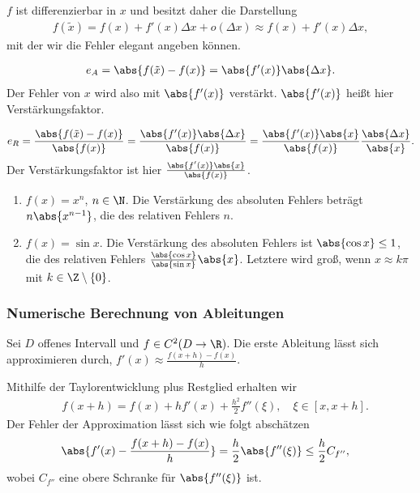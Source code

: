 $f$ ist differenzierbar in $x$ und besitzt daher die Darstellung
\begin{align*}
f(\tilde{x}) = f(x) + f'(x)\Delta x + o(\Delta x) \approx f(x) + f'(x)\Delta x,
\end{align*}
mit der wir die Fehler elegant angeben können.
\begin{bemn}
\begin{align*}
e_A = \abs{f(\tilde{x})-f(x)} = \abs{f'(x)}\abs{\Delta x}.
\end{align*}
Der Fehler von $x$ wird also mit $\abs{f'(x)}$ verstärkt. $\abs{f'(x)}$ heißt
hier Verstärkungsfaktor.
\end{bemn}
\begin{bemn}
\begin{align*}
e_R = \frac{\abs{f(\tilde{x})-f(x)}}{\abs{f(x)}} =
\frac{\abs{f'(x)}\abs{\Delta x}}{\abs{f(x)}}
= \frac{\abs{f'(x)}\abs{x}}{\abs{f(x)}}\frac{\abs{\Delta x}}{\abs{x}}.
\end{align*}
Der Verstärkungsfaktor ist hier $\frac{\abs{f'(x)}\abs{x}}{\abs{f(x)}}$.
\end{bemn}
\begin{bspn}
\begin{enumerate}[label=(\roman{*})]
  \item $f(x) = x^n$, $n\in\N$. Die Verstärkung des absoluten Fehlers beträgt
  $n\abs{x^{n-1}}$, die des relativen Fehlers $n$.
  \item $f(x)=\sin x$. Die Verstärkung des absoluten Fehlers ist $\abs{\cos x}
  \le 1$, die des relativen Fehlers  $\frac{\abs{\cos x}}{\abs{\sin
  x}}\abs{x}$. Letztere wird groß, wenn $x\approx k\pi$ mit
  $k\in\Z\setminus\{0\}$.
  \bsphere
\end{enumerate}
\end{bspn}

\subsubsection{Numerische Berechnung von Ableitungen}
Sei $D$ offenes Intervall und $f\in C^2(D\to\R)$. Die erste Ableitung lässt
sich approximieren durch,
$f'(x)\approx \frac{f(x+h)-f(x)}{h}$.
\begin{bemn}[Fehlerabschätzung.] Mithilfe der Taylorentwicklung plus Restglied
erhalten wir
\begin{align*}
&f(x+h) = f(x) + hf'(x) + \frac{h^2}{2}f''(\xi),\quad \xi\in [x,x+h].
\end{align*}
Der Fehler der Approximation lässt sich wie folgt abschätzen
\begin{align*}
&\abs{f'(x)-\frac{f(x+h)-f(x)}{h}} = \frac{h}{2}\abs{f''(\xi)} \le
\frac{h}{2}C_{f''},
\end{align*}
wobei $C_{f''}$ eine obere Schranke für $\abs{f''(\xi)}$ ist.
\end{bemn}

